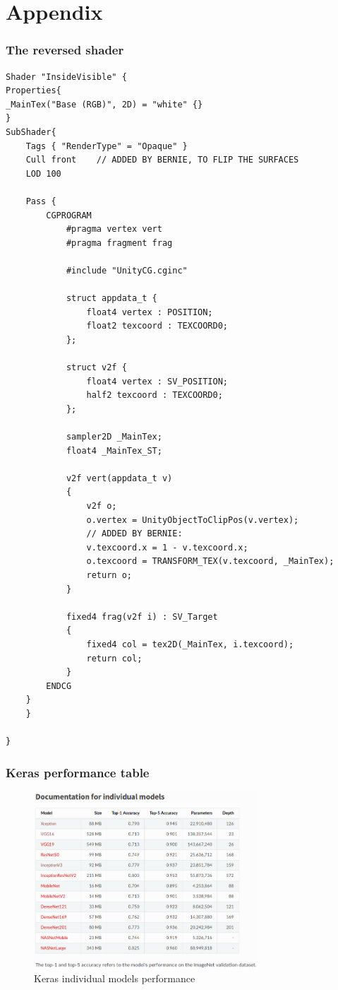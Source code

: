 \appendix
\chapter{Appendix}
\subsection{The reversed shader}\label{apx:shader}
\begin{lstlisting}
Shader "InsideVisible" {
Properties{
_MainTex("Base (RGB)", 2D) = "white" {}
}
SubShader{
	Tags { "RenderType" = "Opaque" }
	Cull front    // ADDED BY BERNIE, TO FLIP THE SURFACES
	LOD 100

	Pass {
		CGPROGRAM
			#pragma vertex vert
			#pragma fragment frag

			#include "UnityCG.cginc"

			struct appdata_t {
				float4 vertex : POSITION;
				float2 texcoord : TEXCOORD0;
			};

			struct v2f {
				float4 vertex : SV_POSITION;
				half2 texcoord : TEXCOORD0;
			};

			sampler2D _MainTex;
			float4 _MainTex_ST;

			v2f vert(appdata_t v)
			{
				v2f o;
				o.vertex = UnityObjectToClipPos(v.vertex);
				// ADDED BY BERNIE:
				v.texcoord.x = 1 - v.texcoord.x;
				o.texcoord = TRANSFORM_TEX(v.texcoord, _MainTex);
				return o;
			}

			fixed4 frag(v2f i) : SV_Target
			{
				fixed4 col = tex2D(_MainTex, i.texcoord);
				return col;
			}
		ENDCG
	}
	}

}
\end{lstlisting}
\subsection{Keras performance table}
\begin{figure}[H]
	\centering        
	\includegraphics[width=0.75\textwidth]{project/images/KerasModels.png}
	\caption{Keras individual models performance}
	\label{fig:keras}
\end{figure}
